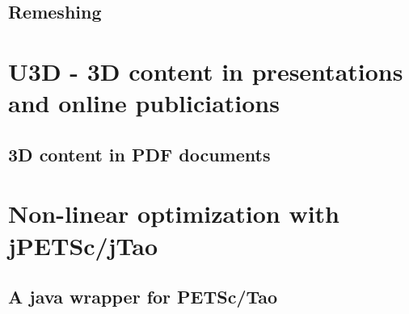 \subsection{Remeshing}

\section{U3D - 3D content in presentations and online publiciations}
\label{sec:u3d}
\subsection{3D content in PDF documents}

\section{Non-linear optimization with jPETSc/jTao}
\label{sec:jpetsctao}
\subsection{A java wrapper for PETSc/Tao}


